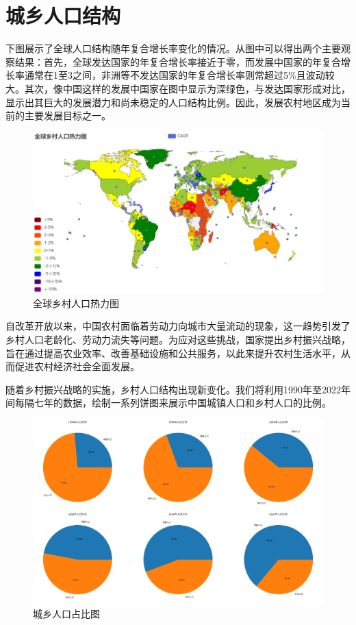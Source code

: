 \chapter{城乡人口结构}
\label{chapter:people}

下图展示了全球人口结构随年复合增长率变化的情况。从图中可以得出两个主要观察结果：首先，全球发达国家的年复合增长率接近于零，而发展中国家的年复合增长率通常在1至3之间，非洲等不发达国家的年复合增长率则常超过5\%且波动较大。其次，像中国这样的发展中国家在图中显示为深绿色，与发达国家形成对比，显示出其巨大的发展潜力和尚未稳定的人口结构比例。因此，发展农村地区成为当前的主要发展目标之一。

\begin{figure}[H]
    \centering
    \includegraphics[width=1\linewidth]{pictures/image.png}
    \caption{全球乡村人口热力图}
    \label{fig:enter-label}
\end{figure}



自改革开放以来，中国农村面临着劳动力向城市大量流动的现象，这一趋势引发了乡村人口老龄化、劳动力流失等问题。为应对这些挑战，国家提出乡村振兴战略，旨在通过提高农业效率、改善基础设施和公共服务，以此来提升农村生活水平，从而促进农村经济社会全面发展。

随着乡村振兴战略的实施，乡村人口结构出现新变化。我们将利用1990年至2022年间每隔七年的数据，绘制一系列饼图来展示中国城镇人口和乡村人口的比例。

\begin{figure}[H]
    \centering
    \includegraphics[width=1\linewidth]{figures/1.png}
    \caption{城乡人口占比图}
    \label{fig:city_village_population}
\end{figure}


